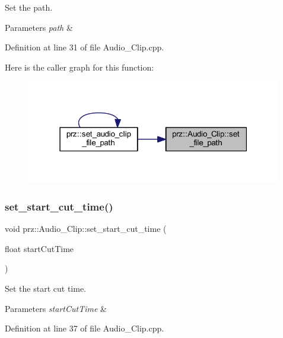 Set the path. 


\begin{DoxyParams}{Parameters}
{\em path} & \\
\hline
\end{DoxyParams}


Definition at line 31 of file Audio\+\_\+\+Clip.\+cpp.

Here is the caller graph for this function\+:
\nopagebreak
\begin{figure}[H]
\begin{center}
\leavevmode
\includegraphics[width=316pt]{classprz_1_1_audio___clip_aa098aaf21788bfdf5410cb1895566391_icgraph}
\end{center}
\end{figure}
\mbox{\label{classprz_1_1_audio___clip_ae2daaa8e064720fdecf051c63660edd5}} 
\subsubsection{\texorpdfstring{set\_start\_cut\_time()}{set\_start\_cut\_time()}}
{\footnotesize\ttfamily void prz\+::\+Audio\+\_\+\+Clip\+::set\+\_\+start\+\_\+cut\+\_\+time (\begin{DoxyParamCaption}\item[{float}]{start\+Cut\+Time }\end{DoxyParamCaption})}



Set the start cut time. 


\begin{DoxyParams}{Parameters}
{\em start\+Cut\+Time} & \\
\hline
\end{DoxyParams}


Definition at line 37 of file Audio\+\_\+\+Clip.\+cpp.

